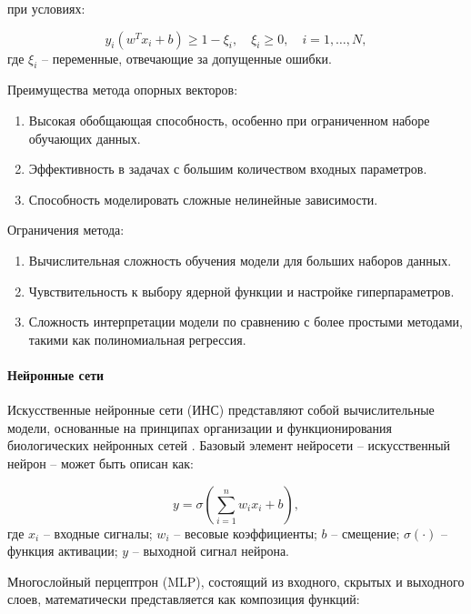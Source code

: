 при условиях:

\begin{equation}
	y_i (w^T x_i + b) \geq 1 - \xi_i, \quad \xi_i \geq 0, \quad i = 1, \ldots, N,
\end{equation}
где $\xi_i$ -- переменные, отвечающие за допущенные ошибки.

Преимущества метода опорных векторов:

\begin{enumerate}
	\item Высокая обобщающая способность, особенно при ограниченном наборе обучающих данных.
	\item Эффективность в задачах с большим количеством входных параметров.
	\item Способность моделировать сложные нелинейные зависимости.
\end{enumerate}

Ограничения метода:

\begin{enumerate}
	\item Вычислительная сложность обучения модели для больших наборов данных.
	\item Чувствительность к выбору ядерной функции и настройке гиперпараметров.
	\item Сложность интерпретации модели по сравнению с более простыми методами, такими как полиномиальная регрессия.
\end{enumerate}

\paragraph{Нейронные сети}

Искусственные нейронные сети (ИНС) представляют собой вычислительные модели, основанные на
принципах организации и функционирования биологических нейронных сетей
\cite{goodfellow2016deep}. Базовый элемент нейросети -- искусственный нейрон -- может быть описан как:

\begin{equation}
    y = \sigma \left( \sum_{i=1}^{n} w_i x_i + b \right),
\end{equation}
где $x_i$ -- входные сигналы;
$w_i$ -- весовые коэффициенты;
$b$ -- смещение;
$\sigma(\cdot)$ -- функция активации;
$y$ -- выходной сигнал нейрона.

Многослойный перцептрон (MLP), состоящий из входного, скрытых
и выходного слоев, математически представляется как композиция функций:

